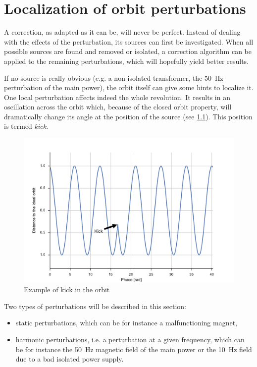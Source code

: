 
\chapter{Localization of orbit perturbations}
\label{sec:localization}

 A correction, as adapted as it can be, will never be perfect. Instead of dealing with the effects of the perturbation, its sources can first be investigated. When all possible sources are found and removed or isolated, a correction algorithm can be applied to the remaining perturbations, which will hopefully yield better results.

 If no source is really obvious (e.g. a non-isolated transformer, the \SI{50}{\hertz} perturbation of the main power), the orbit itself can give some hints to localize it. One local perturbation affects indeed the whole revolution. It results in an oscillation across the orbit which, because of the closed orbit property, will dramatically change its angle at the position of the source (see \cref{fig:kick}). This position is termed \textit{kick}.

\begin{figure}[!h]
	\centering
	\includegraphics[width=\linewidth]{img/kick}
	\caption{\label{fig:kick}Example of kick in the orbit}
\end{figure}

Two types of perturbations will be described in this section:
\begin{itemize}
	\item static perturbations, which can be  for instance a malfunctioning magnet,
	\item harmonic perturbations, i.e. a perturbation at a given frequency, which can be for instance the \SI{50}{Hz} magnetic field of the main power or the \SI{10}{Hz} field due to a bad isolated power supply.
\end{itemize}

